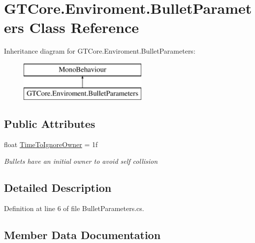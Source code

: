 \hypertarget{class_g_t_core_1_1_enviroment_1_1_bullet_parameters}{}\section{G\+T\+Core.\+Enviroment.\+Bullet\+Parameters Class Reference}
\label{class_g_t_core_1_1_enviroment_1_1_bullet_parameters}
Inheritance diagram for G\+T\+Core.\+Enviroment.\+Bullet\+Parameters\+:\begin{figure}[H]
\begin{center}
\leavevmode
\includegraphics[height=2.000000cm]{class_g_t_core_1_1_enviroment_1_1_bullet_parameters}
\end{center}
\end{figure}
\subsection*{Public Attributes}
\begin{DoxyCompactItemize}
\item 
float \hyperlink{class_g_t_core_1_1_enviroment_1_1_bullet_parameters_a72dde58036092d5d43a50640f31e84b4}{Time\+To\+Ignore\+Owner} = 1f
\begin{DoxyCompactList}\small\item\em Bullets have an initial owner to avoid self collision \end{DoxyCompactList}\end{DoxyCompactItemize}


\subsection{Detailed Description}


Definition at line 6 of file Bullet\+Parameters.\+cs.



\subsection{Member Data Documentation}
\hypertarget{class_g_t_core_1_1_enviroment_1_1_bullet_parameters_a72dde58036092d5d43a50640f31e84b4}{}
